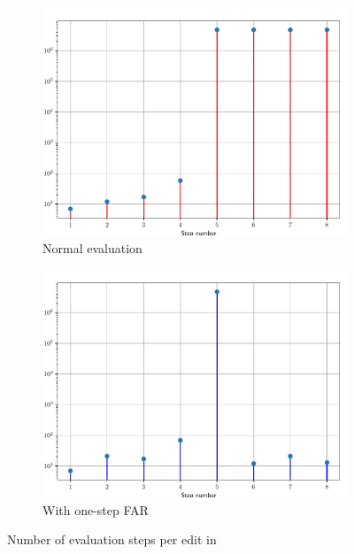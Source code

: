 \documentclass{beamer}
\begin{document}
\begin{frame}[allowframebreaks]
  \begin{figure}
    \centering
    \begin{subfigure}{0.45\textwidth}
      \includegraphics[width=\textwidth]{thesis/img/perf_no_far.pdf}
      \caption{Normal evaluation}
      \label{fig:perf-no-far}
    \end{subfigure}
    \qquad
    \begin{subfigure}{0.45\textwidth}
      \includegraphics[width=\textwidth]{thesis/img/perf_far.pdf}
      \caption{With one-step FAR}
      \label{fig:perf-far-far}
    \end{subfigure}
    \caption{Number of evaluation steps per edit in }
    \label{fig:perf-far}
  \end{figure}
\end{frame}
\end{document}
